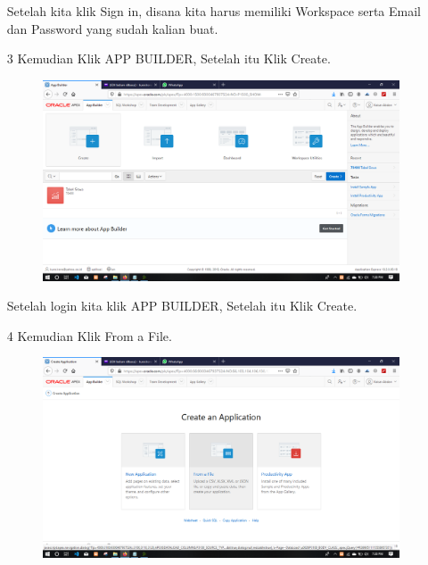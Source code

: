 \begin{enumerate}
\par
Setelah kita klik Sign in, disana kita harus memiliki Workspace serta Email dan Password yang sudah kalian buat.

\item[3]Kemudian Klik APP BUILDER, Setelah itu Klik Create.

\begin{figure}[!htbp]
    \begin{center}
    \includegraphics[scale=0.2]{figures/02.png}
    \end{center}   
    \end{figure}

\par
Setelah login kita klik APP BUILDER, Setelah itu Klik Create.

\item[4]Kemudian Klik From a File.

\begin{figure}[!htbp]
    \begin{center}
    \includegraphics[scale=0.2]{figures/03.png}
    \end{center}   
    \end{figure}


\end{enumerate}
